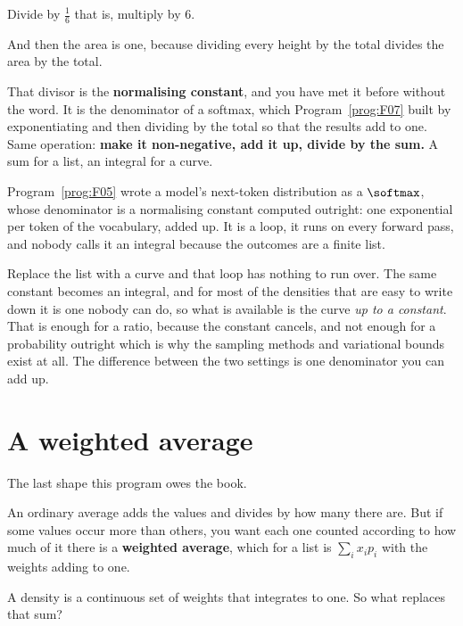\begin{fr}
\begin{ansblock}
Divide by $\frac{1}{6}$ \dash{} that is, multiply by $6$.
\end{ansblock}

And then the area is one, because dividing every height by the total divides
the area by the total.

That divisor is the \textbf{normalising constant}, and you have met it before
without the word. It is the denominator of a softmax, which
Program~\ref{prog:F07} built by exponentiating and then dividing by the total
so that the results add to one. Same operation: \textbf{make it non-negative,
add it up, divide by the sum.} A sum for a list, an integral for a curve.

\begin{aibox}
Program~\ref{prog:F05} wrote a model's next-token distribution as a
$\softmax$, whose denominator is a normalising constant computed outright: one
exponential per token of the vocabulary, added up. It is a loop, it runs on
every forward pass, and nobody calls it an integral because the outcomes are a
finite list.

Replace the list with a curve and that loop has nothing to run over. The same
constant becomes an integral, and for most of the densities that are easy to
write down it is one nobody can do, so what is available is the curve
\emph{up to a constant}. That is enough for a ratio, because the constant
cancels, and not enough for a probability outright \dash{} which is why the
sampling methods and variational bounds exist at all. The difference between
the two settings is one denominator you can add up.
\end{aibox}
\end{fr}

\section{A weighted average}
\label{sec:F13-average}

\begin{fr}
The last shape this program owes the book.

An ordinary average adds the values and divides by how many there are. But if
some values occur more than others, you want each one counted according to how
much of it there is \dash{} a \textbf{weighted average}, which for a list is
$\sum_i x_i p_i$ with the weights adding to one.

A density is a continuous set of weights that integrates to one. So what
replaces that sum?
\nextframe
\end{fr}

